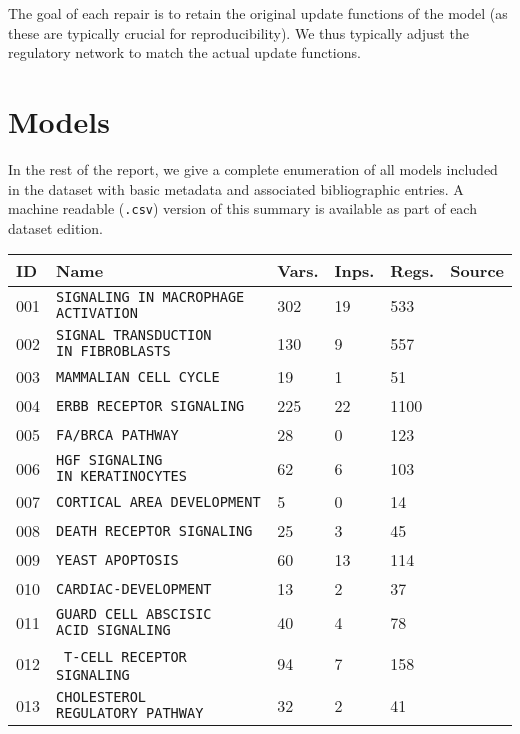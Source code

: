 \documentclass{article}
\begin{document}
The goal of each repair is to retain the original update functions of the model (as these are typically crucial for reproducibility). We thus typically adjust the regulatory network to match the actual update functions.

\section{Models}

In the rest of the report, we give a complete enumeration of all models included in the dataset with basic metadata and associated bibliographic entries. A machine readable (\texttt{.csv}) version of this summary is available as part of each dataset edition.

\begin{center}
	\begin{tabular}{ | C{16pt} | C{144pt} | C{25pt} | C{25pt} | C{25pt} | C{36pt} | }
		\hline
		ID & Name & Vars. & Inps. & Regs. & Source \\  & \texttt{SIGNALING IN MACROPHAGE ACTIVATION} & 302 & 19 & 533 & \cite{bbm-001} \\  & \texttt{SIGNAL TRANSDUCTION IN~FIBROBLASTS} & 130 & 9 & 557 & \cite{bbm-002} \\  & \texttt{MAMMALIAN CELL CYCLE} & 19 & 1 & 51 & \cite{bbm-003} \\  & \texttt{ERBB RECEPTOR SIGNALING} & 225 & 22 & 1100 & \cite{bbm-004}  \\  & \texttt{FA/BRCA PATHWAY} & 28 & 0 & 123 & \cite{bbm-005} \\  & \texttt{HGF SIGNALING IN~KERATINOCYTES} & 62 & 6 & 103 & \cite{bbm-006} \\  & \texttt{CORTICAL AREA DEVELOPMENT} & 5 & 0 & 14 & \cite{bbm-007} \\  & \texttt{DEATH RECEPTOR SIGNALING} & 25 & 3 & 45 & \cite{bbm-008-150} \\  & \texttt{YEAST APOPTOSIS} & 60 & 13 & 114 & \cite{bbm-009} \\  & \texttt{CARDIAC-DEVELOPMENT} & 13 & 2 & 37 & \cite{bbm-010} \\  & \texttt{GUARD CELL ABSCISIC ACID~SIGNALING} & 40 & 4 & 78 & \cite{bbm-011} \\  & \texttt{T-CELL RECEPTOR SIGNALING} & 94 & 7 & 158 & \cite{bbm-012} \\  & \texttt{CHOLESTEROL REGULATORY~PATHWAY} & 32 & 2 & 41 & \cite{bbm-013} \\ \hline

\end{tabular}
\end{center}
\end{document}
